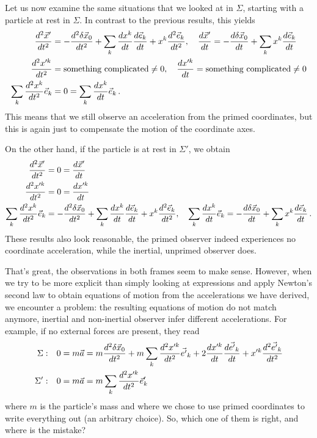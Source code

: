 \documentclass[../class_mech_main.tex]{subfiles}
\begin{document}
\begin{itemize}
	Let us now examine the same situations that we looked at in $\Sigma$, starting with a particle at rest in $\Sigma$. In contrast to the previous results, this yields
	\begin{align*}
		\dv[2]{\vec{x}'}{t} &= -\dv[2]{\delta \vec{x}_0}{t} + \sum_k \dv{x^k}{t} \dv{\vec{e}_k}{t} + x^k \dv[2]{\vec{e}_k}{t},
		\quad \dv{\vec{x}'}{t} = -\dv{\delta \vec{x}_0}{t} + \sum_k x^k \dv{\vec{e}_k}{t}
		\\
		\dv[2]{x'^k}{t} &= \text{something complicated} \neq 0,
		\quad \dv{x'^k}{t} = \text{something complicated} \neq 0
		\\
		\sum_k \dv[2]{x^k}{t} \vec{e}_k &= 0 = \sum_k \dv{x^k}{t} \vec{e}_k \, .
	\end{align*}
	This means that we still observe an acceleration from the primed coordinates, but this is again just to compensate the motion of the coordinate axes.

	On the other hand, if the particle is at rest in $\Sigma'$, we obtain
	\begin{align*}
		\dv[2]{\vec{x}'}{t} &= 0 = \dv{\vec{x}'}{t}
		\\
		\dv[2]{x'^k}{t} &= 0 = \dv{x'^k}{t}
		\\
		\sum_k \dv[2]{x^k}{t} \vec{e}_k &= -\dv[2]{\delta \vec{x}_0}{t} + \sum_k \dv{x^k}{t} \dv{\vec{e}_k}{t} + x^k \dv[2]{\vec{e}_k}{t},
		\quad \sum_k \dv{x^k}{t} \vec{e}_k = -\dv{\delta \vec{x}_0}{t} + \sum_k x^k \dv{\vec{e}_k}{t} \, .
	\end{align*}
	These results also look reasonable, the primed observer indeed experiences no coordinate acceleration, while the inertial, unprimed observer does.
\end{itemize}

That's great, the observations in both frames seem to make sense. However, when we try to be more explicit than simply looking at expressions and apply Newton's second law to obtain equations of motion from the accelerations we have derived, we encounter a problem: the resulting equations of motion do not match anymore, inertial and non-inertial observer infer different accelerations. For example, if no external forces are present, they read
\begin{align}
	\Sigma: \quad & 0 = m \vec{a} = m \dv[2]{\delta \vec{x}_0}{t} + m \sum_k \dv[2]{x'^k}{t} \vec{e'}_k + 2 \dv{x'^k}{t} \dv{\vec{e'}_k}{t} + x'^k \dv[2]{\vec{e'}_k}{t}
	\label{eq:eqofmotion_from_accel_frame_in_inert_frame}
	\\
	\Sigma': \quad & 0 = m \vec{a} = m \sum_k \dv[2]{x'^k}{t} \vec{e}'_k
	\label{eq:eqofmotion_from_accel_frame_in_accel_frame}
\end{align}
where $m$ is the particle's mass and where we chose to use primed coordinates to write everything out (an arbitrary choice). So, which one of them is right, and where is the mistake?
\end{document}
